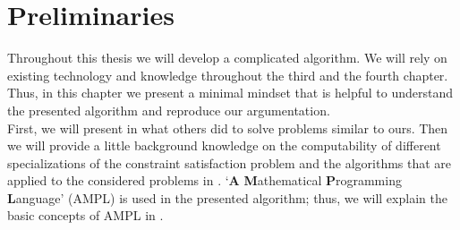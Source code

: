 \chapter{Preliminaries}
\label{chap:preliminaries}
Throughout this thesis we will develop a complicated algorithm. We will rely on existing technology and knowledge throughout the third and the fourth chapter. Thus, in this chapter we present a minimal mindset that is helpful to understand the presented algorithm and reproduce our argumentation. \\
First, we will present in  what others did to solve problems similar to ours.
Then we will provide a little background knowledge on the computability of different specializations of the constraint satisfaction problem and the algorithms that are applied to the considered problems in . 
`\textbf{A} \textbf{M}athematical \textbf{P}rogramming \textbf{L}anguage' (AMPL) is used in the presented algorithm; thus, we will explain the basic concepts of AMPL in . 
